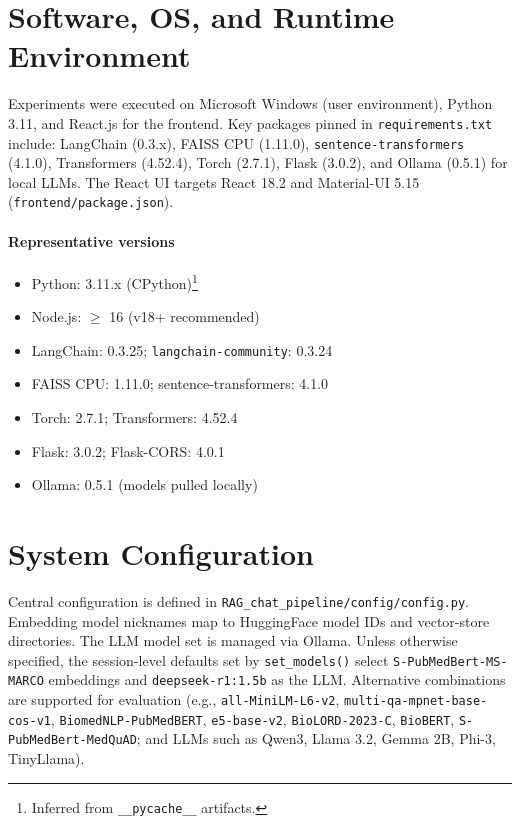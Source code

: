 \section{Software, OS, and Runtime Environment}
Experiments were executed on Microsoft Windows (user environment), Python 3.11, and React.js for the frontend. Key packages pinned in \texttt{requirements.txt} include: LangChain (0.3.x), FAISS CPU (1.11.0), \texttt{sentence-transformers} (4.1.0), Transformers (4.52.4), Torch (2.7.1), Flask (3.0.2), and Ollama (0.5.1) for local LLMs. The React UI targets React 18.2 and Material-UI 5.15 (\texttt{frontend/package.json}).

\paragraph{Representative versions}
\begin{itemize}
  \item Python: 3.11.x (CPython)\footnote{Inferred from \texttt{\_\_pycache\_\_} artifacts.}
  \item Node.js: \(\ge\) 16 (v18+ recommended)
  \item LangChain: 0.3.25; \texttt{langchain-community}: 0.3.24
  \item FAISS CPU: 1.11.0; sentence-transformers: 4.1.0
  \item Torch: 2.7.1; Transformers: 4.52.4
  \item Flask: 3.0.2; Flask-CORS: 4.0.1
  \item Ollama: 0.5.1 (models pulled locally)
\end{itemize}

\section{System Configuration}
Central configuration is defined in \texttt{RAG\_chat\_pipeline/config/config.py}. Embedding model nicknames map to HuggingFace model IDs and vector-store directories. The LLM model set is managed via Ollama. Unless otherwise specified, the session-level defaults set by \texttt{set\_models()} select \texttt{S-PubMedBert-MS-MARCO} embeddings and \texttt{deepseek-r1:1.5b} as the LLM. Alternative combinations are supported for evaluation (e.g., \texttt{all-MiniLM-L6-v2}, \texttt{multi-qa-mpnet-base-cos-v1}, \texttt{BiomedNLP-PubMedBERT}, \texttt{e5-base-v2}, \texttt{BioLORD-2023-C}, \texttt{BioBERT}, \texttt{S-PubMedBert-MedQuAD}; and LLMs such as Qwen3, Llama 3.2, Gemma 2B, Phi-3, TinyLlama).

